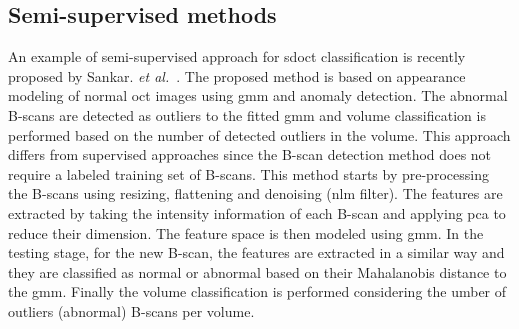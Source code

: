 


\subsection{Semi-supervised methods}
An example of semi-supervised approach for \gls{sdoct} classification is recently proposed by Sankar. \textit{et al.}~\cite{sankar2016classification}.
The proposed method is based on appearance modeling of normal \gls{oct} images using \gls{gmm} and anomaly detection.
The abnormal B-scans are detected as outliers to the fitted \gls{gmm} and volume classification is performed based on the number of detected outliers in the volume.
This approach differs from supervised approaches since the B-scan detection method does not require a labeled training set of B-scans.
This method starts by pre-processing the B-scans using resizing, flattening and denoising (\gls{nlm} filter).
The features are extracted by taking the intensity information of each B-scan and applying \gls{pca} to reduce their dimension.
The feature space is then modeled using \gls{gmm}.
In the testing stage, for the new B-scan, the features are extracted in a similar way and they are classified as normal or abnormal based on their Mahalanobis distance to the \gls{gmm}.
Finally the volume classification is performed considering the umber of outliers (abnormal) B-scans per volume.


